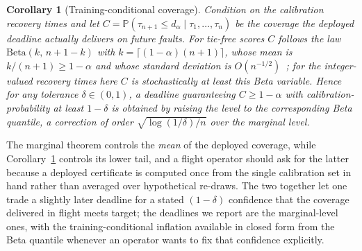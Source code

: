 \documentclass[11pt]{article}
\theoremstyle{plain}
\newtheorem{corollary}{Corollary}
\theoremstyle{definition}
\newcommand{\Prob}{\mathbb{P}}
\newcommand{\dalpha}{d_{\alpha}}
\begin{document}
\begin{corollary}[Training-conditional coverage]
\label{cor:training}
Condition on the calibration recovery times and let
$C=\Prob(\tau_{n+1}\le\dalpha\mid \tau_1,\dots,\tau_n)$ be the coverage the deployed deadline
actually delivers on future faults. For tie-free scores $C$ follows the law
$\mathrm{Beta}(k,\,n+1-k)$ with $k=\lceil(1-\alpha)(n+1)\rceil$, whose mean is
$k/(n+1)\ge1-\alpha$ and whose standard deviation is $O(n^{-1/2})$~\cite{Vovk2012}; for the
integer-valued recovery times here $C$ is stochastically at least this Beta variable. Hence
for any tolerance $\delta\in(0,1)$, a deadline guaranteeing $C\ge1-\alpha$ with
calibration-probability at least $1-\delta$ is obtained by raising the level to the
corresponding Beta quantile, a correction of order $\sqrt{\log(1/\delta)/n}$ over the
marginal level.
\end{corollary}

The marginal theorem controls the \emph{mean} of the deployed coverage, while
Corollary~\ref{cor:training} controls its lower tail, and a flight operator should ask for
the latter because a deployed certificate is computed once from the single calibration set in
hand rather than averaged over hypothetical re-draws. The two together let one trade a
slightly later deadline for a stated $(1-\delta)$ confidence that the coverage delivered in
flight meets target; the deadlines we report are the marginal-level ones, with the
training-conditional inflation available in closed form from the Beta quantile whenever an
operator wants to fix that confidence explicitly.
\end{document}
